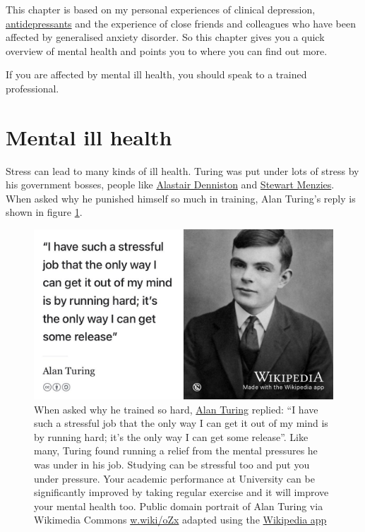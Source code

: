\documentclass[
]{book}
\begin{document}
This chapter is based on my personal experiences of clinical depression, \href{https://en.wikipedia.org/wiki/Antidepressant}{antidepressants} and the experience of close friends and colleagues who have been affected by generalised anxiety disorder. So this chapter gives you a quick overview of mental health and points you to where you can find out more.

If you are affected by mental ill health, you should speak to a trained professional.

\hypertarget{illhealth}{%
\section{Mental ill health}\label{illhealth}}

Stress can lead to many kinds of ill health. Turing was put under lots of stress by his government bosses, people like \href{https://en.wikipedia.org/wiki/Alastair_Denniston}{Alastair Denniston} and \href{https://en.wikipedia.org/wiki/Stewart_Menzies}{Stewart Menzies}. \citep{imitationgame} When asked why he punished himself so much in training, Alan Turing's reply is shown in figure \ref{fig:turing-stress-fig}.

\begin{figure}

{\centering \includegraphics[width=0.99\linewidth]{images/turunning-machine} 

}

\caption{When asked why he trained so hard, \href{https://en.wikipedia.org/wiki/Alan_Turing}{Alan Turing} replied: ``I have such a stressful job that the only way I can get it out of my mind is by running hard; it's the only way I can get some release''. Like many, Turing found running a relief from the mental pressures he was under in his job. \citep{kottke} Studying can be stressful too and put you under pressure. Your academic performance at University can be significantly improved by taking regular exercise and it will improve your mental health too. Public domain portrait of Alan Turing via Wikimedia Commons \href{https://w.wiki/oZx}{w.wiki/oZx} adapted using the \href{https://apps.apple.com/gb/app/wikipedia/id324715238}{Wikipedia app}}\label{fig:turing-stress-fig}
\end{figure}
\end{document}
